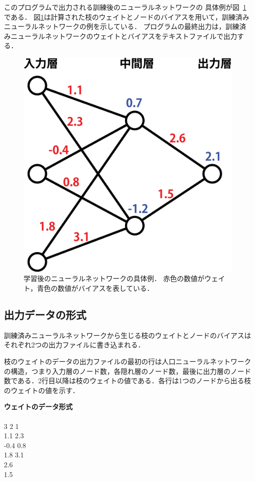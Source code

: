 \documentclass[11pt,titlepage,dvipdfmx,twoside]{jarticle}
\begin{document}
このプログラムで出力される訓練後のニューラルネットワークの
具体例が図~\ref{fig:sample}である．
図\ref{fig:sample}は計算された枝のウェイトとノードのバイアスを用いて，訓練済みニューラルネットワークの例を示している．
プログラムの最終出力は，訓練済みニューラルネットワークのウェイトとバイアスをテキストファイルで出力する．

\begin{figure}[H]
  \centering
  \includegraphics[width = 0.4 \textwidth]{./fig/ANN_sample_jp}
  \caption{学習後のニューラルネットワークの具体例．
  赤色の数値がウェイト，青色の数値がバイアスを表している．}
  \label{fig:sample}
\end{figure}


\subsection{出力データの形式}
\label{sec:section3_4}

訓練済みニューラルネットワークから生じる枝のウェイトとノードのバイアスはそれぞれ2つの出力ファイルに書き込まれる．

枝のウェイトのデータの出力ファイルの最初の行は人口ニューラルネットワークの構造，つまり入力層のノード数，各隠れ層のノード数，最後に出力層のノード数である．2行目以降は枝のウェイトの値である．各行は1つのノードから出る枝のウェイトの値を示す．

\bigskip

\begin{oframed}
{\bf ウェイトのデータ形式}\\\\
3 2 1\\
1.1 2.3\\
-0.4 0.8\\
1.8 3.1\\
2.6\\
1.5\\
\end{oframed}

\bigskip
\end{document}
